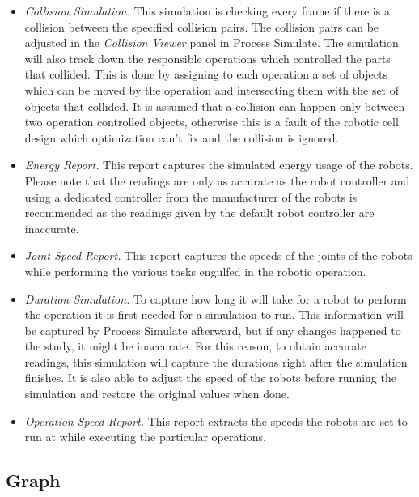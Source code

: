 \begin{itemize}

\item \emph{Collision Simulation.} This simulation is checking every frame if there is a collision between the specified collision pairs. The collision pairs can be adjusted in the \emph{Collision Viewer} panel in Process Simulate. The simulation will also track down the responsible operations which controlled the parts that collided. This is done by assigning to each operation a set of objects which can be moved by the operation and intersecting them with the set of objects that collided. It is assumed that a collision can happen only between two operation controlled objects, otherwise this is a fault of the robotic cell design which optimization can't fix and the collision is ignored.

\item \emph{Energy Report.} This report captures the simulated energy usage of the robots. Please note that the readings are only as accurate as the robot controller and using a dedicated controller from the manufacturer of the robots is recommended as the readings given by the default robot controller are inaccurate.

\item \emph{Joint Speed Report.} This report captures the speeds of the joints of the robots while performing the various tasks engulfed in the robotic operation.

\item \emph{Duration Simulation.} To capture how long it will take for a robot to perform the operation it is first needed for a simulation to run. This information will be captured by Process Simulate afterward, but if any changes happened to the study, it might be inaccurate. For this reason, to obtain accurate readings, this simulation will capture the durations right after the simulation finishes. It is also able to adjust the speed of the robots before running the simulation and restore the original values when done. 

\item \emph{Operation Speed Report.} This report extracts the speeds the robots are set to run at while executing the particular operations. 

\end{itemize}

\subsection{Graph}

